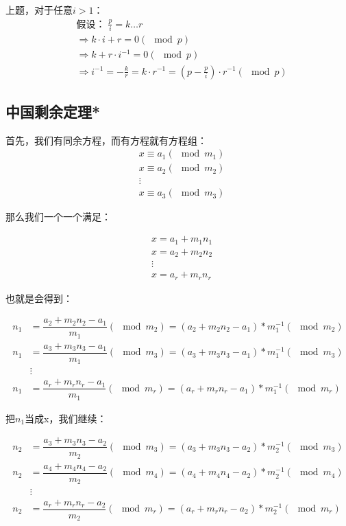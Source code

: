 \documentclass[12pt]{article}
\begin{document}
上题，对于任意$i>1$：
\begin{align*}
    &\text{假设：}\;\frac{p}{i}=k\dots r\\
    &\Rightarrow k\cdot i+r= 0(\mod p)\\
    &\Rightarrow k+r\cdot i^{-1}= 0(\mod p)\\
    &\Rightarrow i^{-1}=-\frac{k}{r}=k\cdot r^{-1}=(p-\frac{p}{i})\cdot r^{-1}(\mod p)
\end{align*}

\subsection{中国剩余定理*}

首先，我们有同余方程，而有方程就有方程组：
\begin{align*}
    &x\equiv  a_{1}(\mod m_{1})\\
    &x\equiv  a_{2}(\mod m_{2})\\
    &\vdots\\
    &x\equiv  a_{3}(\mod m_{3})
\end{align*}

那么我们一个一个满足：

\begin{align*}
    &x=a_{1}+m_{1}n_{1}\\
    &x=a_{2}+m_{2}n_{2}\\
    &\vdots\\
    &x=a_{r}+m_{r}n_{r}
\end{align*}

也就是会得到：

\begin{align*}
    n_{1}&=\dfrac{a_{2}+m_{2}n_{2}-a_{1}}{m_{1}} (\mod m_{2})=(a_{2}+m_{2}n_{2}-a_{1})*m^{-1}_{1} (\mod m_{2})\\
    n_{1}&=\dfrac{a_{3}+m_{3}n_{3}-a_{1}}{m_{1}} (\mod m_{3})=(a_{3}+m_{3}n_{3}-a_{1})*m^{-1}_{1} (\mod m_{3})\\
    &\vdots\\
    n_{1}&=\dfrac{a_{r}+m_{r}n_{r}-a_{1}}{m_{1}} (\mod m_{r})=(a_{r}+m_{r}n_{r}-a_{1})*m^{-1}_{1} (\mod m_{r})
\end{align*}

把$n_1$当成x，我们继续：

\begin{align*}
    n_{2}&=\dfrac{a_{3}+m_{3}n_{3}-a_{2}}{m_{2}} (\mod m_{3})=(a_{3}+m_{3}n_{3}-a_{2})*m^{-1}_{2} (\mod m_{3})\\
    n_{2}&=\dfrac{a_{4}+m_{4}n_{4}-a_{2}}{m_{2}} (\mod m_{4})=(a_{4}+m_{4}n_{4}-a_{2})*m^{-1}_{2} (\mod m_{4})\\
    &\vdots\\
    n_{2}&=\dfrac{a_{r}+m_{r}n_{r}-a_{2}}{m_{2}} (\mod m_{r})=(a_{r}+m_{r}n_{r}-a_{2})*m^{-1}_{2} (\mod m_{r})
\end{align*}
\end{document}
